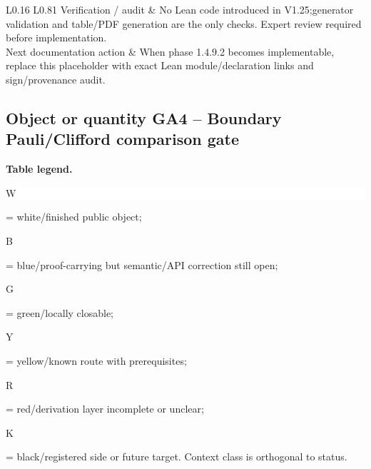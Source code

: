 \begin{longtable}{L{0.16\linewidth} L{0.81\linewidth}}
\hline\addlinespace[0.20em]
Verification /\allowbreak{} audit & No Lean code introduced in V1.25;\newline generator validation and table/\allowbreak{}PDF generation are the only checks. Expert review required before implementation.\\
\hline\addlinespace[0.20em]
Next documentation action & When phase 1.4.9.2 becomes implementable, replace this placeholder with exact Lean module/\allowbreak{}declaration links and sign/\allowbreak{}provenance audit.\\
\hline\addlinespace[0.20em]
\end{longtable}
\subsection*{Object or quantity GA4 -- Boundary Pauli/\allowbreak{}Clifford comparison gate}
\hypertarget{objproof:GA4}{}
\par\smallskip\noindent\begin{minipage}{0.99\linewidth}\footnotesize\raggedright\textbf{Table legend.} \colorbox{white}{\strut W} = white/finished public object; \colorbox{cyan!20}{\strut B} = blue/proof-carrying but semantic/API correction still open; \colorbox{green!18}{\strut G} = green/locally closable; \colorbox{yellow!25}{\strut Y} = yellow/known route with prerequisites; \colorbox{red!20}{\strut R} = red/derivation layer incomplete or unclear; \colorbox{black!18}{\strut K} = black/registered side or future target. Context class is orthogonal to status.\end{minipage}\par\vspace{0.25em}
